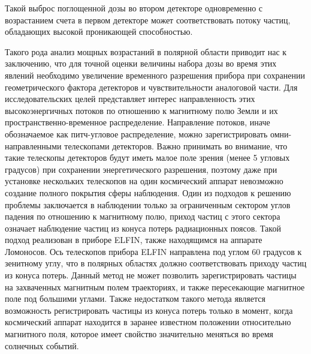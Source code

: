 Такой выброс поглощенной дозы во втором детекторе одновременно с возрастанием счета в первом детекторе может соответствовать потоку частиц, обладающих высокой проникающей способностью.

Такого рода анализ мощных возрастаний в полярной области приводит нас к заключению, что для точной оценки величины набора дозы во время этих явлений необходимо увеличение временного разрешения прибора при сохранении геометрического фактора детекторов и чувствительности аналоговой части. Для исследовательских целей представляет интерес направленность этих высокоэнергичных потоков по отношению к магнитному полю Земли и их пространственно-временное распределение. Направление потоков, иначе обозначаемое как питч-угловое распределение, можно зарегистрировать омни-направленными телескопами детекторов. Важно принимать во внимание, что такие телескопы детекторов будут иметь малое поле зрения (менее 5 угловых градусов) при сохранении энергетического разрешения, поэтому даже при установке нескольких телескопов на один космический аппарат невозможно создание полного покрытия сферы наблюдения. Один из подходов к решению проблемы заключается в наблюдении только за ограниченным сектором углов падения по отношению к магнитному полю, приход частиц с этого сектора означает наблюдение частиц из конуса потерь радиационных поясов. Такой подход реализован в приборе ELFIN, также находящимся на аппарате Ломоносов. Ось телескопов прибора ELFIN направлена под углом 60 градусов к зенитному углу, что в полярных областях должно соответствовать приходу частиц из конуса потерь. Данный метод не может позволить зарегистрировать частицы на захваченных магнитным полем траекториях, и также пересекающие магнитное поле под большими углами. Также недостатком такого метода является возможность регистрировать частицы из конуса потерь только в момент, когда космический аппарат находится в заранее известном положении относительно магнитного поля, которое имеет свойство значительно меняться во время солнечных событий.

